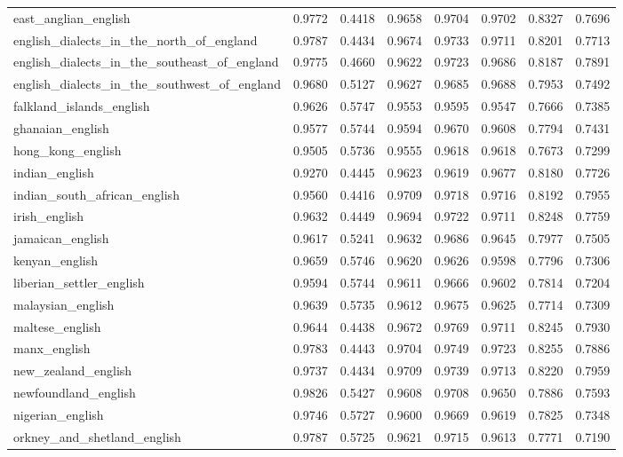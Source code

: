 \begin{landscape}
\begin{longtable}{lccccccc}
east\_anglian\_english & 0.9772 & 0.4418 & 0.9658 & 0.9704 & 0.9702 & 0.8327 & 0.7696 \\
english\_dialects\_in\_the\_north\_of\_england & 0.9787 & 0.4434 & 0.9674 & 0.9733 & 0.9711 & 0.8201 & 0.7713 \\
english\_dialects\_in\_the\_southeast\_of\_england & 0.9775 & 0.4660 & 0.9622 & 0.9723 & 0.9686 & 0.8187 & 0.7891 \\
english\_dialects\_in\_the\_southwest\_of\_england & 0.9680 & 0.5127 & 0.9627 & 0.9685 & 0.9688 & 0.7953 & 0.7492 \\
falkland\_islands\_english & 0.9626 & 0.5747 & 0.9553 & 0.9595 & 0.9547 & 0.7666 & 0.7385 \\
ghanaian\_english & 0.9577 & 0.5744 & 0.9594 & 0.9670 & 0.9608 & 0.7794 & 0.7431 \\
hong\_kong\_english & 0.9505 & 0.5736 & 0.9555 & 0.9618 & 0.9618 & 0.7673 & 0.7299 \\
indian\_english & 0.9270 & 0.4445 & 0.9623 & 0.9619 & 0.9677 & 0.8180 & 0.7726 \\
indian\_south\_african\_english & 0.9560 & 0.4416 & 0.9709 & 0.9718 & 0.9716 & 0.8192 & 0.7955 \\
irish\_english & 0.9632 & 0.4449 & 0.9694 & 0.9722 & 0.9711 & 0.8248 & 0.7759 \\
jamaican\_english & 0.9617 & 0.5241 & 0.9632 & 0.9686 & 0.9645 & 0.7977 & 0.7505 \\
kenyan\_english & 0.9659 & 0.5746 & 0.9620 & 0.9626 & 0.9598 & 0.7796 & 0.7306 \\
liberian\_settler\_english & 0.9594 & 0.5744 & 0.9611 & 0.9666 & 0.9602 & 0.7814 & 0.7204 \\
malaysian\_english & 0.9639 & 0.5735 & 0.9612 & 0.9675 & 0.9625 & 0.7714 & 0.7309 \\
maltese\_english & 0.9644 & 0.4438 & 0.9672 & 0.9769 & 0.9711 & 0.8245 & 0.7930 \\
manx\_english & 0.9783 & 0.4443 & 0.9704 & 0.9749 & 0.9723 & 0.8255 & 0.7886 \\
new\_zealand\_english & 0.9737 & 0.4434 & 0.9709 & 0.9739 & 0.9713 & 0.8220 & 0.7959 \\
newfoundland\_english & 0.9826 & 0.5427 & 0.9608 & 0.9708 & 0.9650 & 0.7886 & 0.7593 \\
nigerian\_english & 0.9746 & 0.5727 & 0.9600 & 0.9669 & 0.9619 & 0.7825 & 0.7348 \\
orkney\_and\_shetland\_english & 0.9787 & 0.5725 & 0.9621 & 0.9715 & 0.9613 & 0.7771 & 0.7190 \\

\end{longtable}
\end{landscape}
